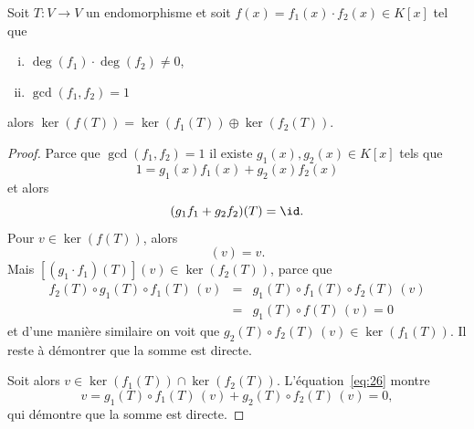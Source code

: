 \begin{theorem}
  \label{thr:37}
  Soit $T: V \rightarrow V$ un endomorphisme et soit $f(x) = f_1(x) \cdot f_2(x) ∈ K[x]$ tel que
  \begin{enumerate}[i)]
  \item $\deg(f_1) \cdot \deg(f_2) \neq 0$,
  \item $\gcd(f_1,f_2) = 1$ 
  \end{enumerate}
  alors 
  $
      \ker(f(T)) = \ker(f_1(T)) \oplus \ker(f_2(T)) 
   $.   
\end{theorem}
\begin{proof}
  Parce que $\gcd(f_1,f_2)=1$ il existe $g_1(x),g_2(x) ∈ K[x]$ tels que 
  \begin{displaymath}
    1 = g_1(x) f_1(x) + g_2(x) f_2(x)
  \end{displaymath}
  et alors 
  \begin{equation}
    \label{eq:26}   
    (g_1 f_1 +  g_2  f_2)(T) = \id. 
  \end{equation}
  Pour $v \in \ker(f(T))$, alors 
\begin{displaymath}
  [( g_1  f_1  + g_2 f_2)(T)]  (v)  = v. 
\end{displaymath}
Mais $[(g_1 \cdot f_1)(T)] ( v) \in \ker(f_2(T))$, parce que  
\begin{eqnarray*}
  f_2(T) \circ  g_1(T) \circ f_1(T)\, ( v)  & = &    g_1(T) \circ f_1(T) \circ f_2(T) \,( v) \\
                                          &  =&  g_1(T) \circ f(T) \, (v) = 0
\end{eqnarray*}
et d'une manière similaire on voit que $g_2(T)\circ  f_2(T) \, (v) \in \ker(f_1(T))$. Il reste à démontrer que la somme est directe. 

Soit alors $v ∈  \ker(f_1(T))  ∩  \ker(f_2(T))$.  L'équation~\eqref{eq:26} montre 
\begin{displaymath}
  v =  g_1(T) \circ f_1(T)\, (v) +  g_2(T) \circ f_2(T)\, ( v) = 0,
\end{displaymath}
qui démontre que la somme est directe. 
\end{proof}


